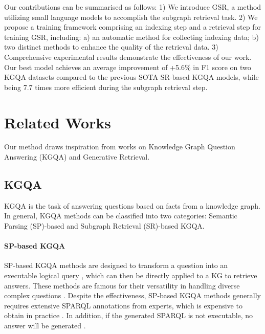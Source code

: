 \documentclass[11pt]{article}
\begin{document}
Our contributions can be summarised as follows: 1) We introduce GSR, a method utilizing small language models to accomplish the subgraph retrieval task. 2) We propose a training framework comprising an indexing step and a retrieval step for training GSR, including: a) an automatic method for collecting indexing data; b) two distinct methods to enhance the quality of the retrieval data. 3) Comprehensive experimental results demonstrate the effectiveness of our work. Our best model achieves an average improvement of +5.6\% in F1 score on two KGQA datasets compared to the previous SOTA SR-based KGQA models, while being 7.7 times more efficient during the subgraph retrieval step.



\section{Related Works}
Our method draws inspiration from works on Knowledge Graph Question Answering (KGQA) and Generative Retrieval.

\subsection{KGQA}
KGQA is the task of answering questions based on facts from a knowledge graph. In general, KGQA methods can be classified into two categories: Semantic Parsing (SP)-based and Subgraph Retrieval (SR)-based KGQA. 

\paragraph{SP-based KGQA}
SP-based KGQA methods are designed to transform a question into an executable logical query \citep{hu-etal-2022-logical, das-etal-2021-case, luo2023chatkbqa}, which can then be directly applied to a KG to retrieve answers. These methods are famous for their versatility in handling diverse complex questions \citep{DBLP:journals/aiopen/ZhangZKLHSCL23}. 
Despite the effectiveness, SP-based KGQA methods generally requires extensive SPARQL annotations from experts, which is expensive to obtain in practice \citep{zhang-etal-2022-subgraph}. In addition, if the generated SPARQL is not executable, no answer will be generated \citep{luo2024reasoning}.
\end{document}
